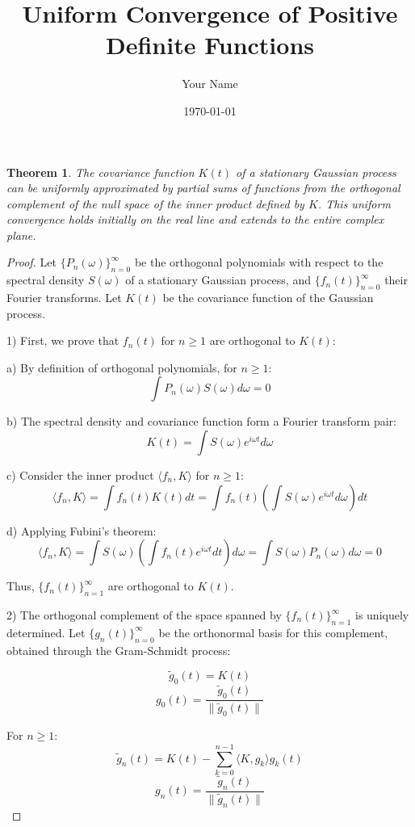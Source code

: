 \documentclass{article}
\title{Uniform Convergence of Positive Definite Functions}
\author{Your Name}
\date{\today}
\newtheorem{theorem}{Theorem}
\begin{document}
\maketitle

\begin{theorem}
The covariance function $K(t)$ of a stationary Gaussian process can be uniformly approximated by partial sums of functions from the orthogonal complement of the null space of the inner product defined by $K$. This uniform convergence holds initially on the real line and extends to the entire complex plane.
\end{theorem}

\begin{proof}
Let $\{P_n(\omega)\}_{n=0}^{\infty}$ be the orthogonal polynomials with respect to the spectral density $S(\omega)$ of a stationary Gaussian process, and $\{f_n(t)\}_{n=0}^{\infty}$ their Fourier transforms. Let $K(t)$ be the covariance function of the Gaussian process.

1) First, we prove that $f_n(t)$ for $n \geq 1$ are orthogonal to $K(t)$:

   a) By definition of orthogonal polynomials, for $n \geq 1$:
      $$\int P_n(\omega)S(\omega)d\omega = 0$$

   b) The spectral density and covariance function form a Fourier transform pair:
      $$K(t) = \int S(\omega)e^{i\omega t}d\omega$$

   c) Consider the inner product $\langle f_n, K \rangle$ for $n \geq 1$:
      $$\langle f_n, K \rangle = \int f_n(t)K(t)dt = \int f_n(t) \left(\int S(\omega)e^{i\omega t}d\omega\right) dt$$

   d) Applying Fubini's theorem:
      $$\langle f_n, K \rangle = \int S(\omega) \left(\int f_n(t)e^{i\omega t}dt\right) d\omega = \int S(\omega)P_n(\omega)d\omega = 0$$

   Thus, $\{f_n(t)\}_{n=1}^{\infty}$ are orthogonal to $K(t)$.

2) The orthogonal complement of the space spanned by $\{f_n(t)\}_{n=1}^{\infty}$ is uniquely determined. Let $\{g_n(t)\}_{n=0}^{\infty}$ be the orthonormal basis for this complement, obtained through the Gram-Schmidt process:

   $$\tilde{g}_0(t) = K(t)$$
   $$g_0(t) = \frac{\tilde{g}_0(t)}{\|\tilde{g}_0(t)\|}$$

   For $n \geq 1$:
   $$\tilde{g}_n(t) = K(t) - \sum_{k=0}^{n-1} \langle K, g_k \rangle g_k(t)$$
   $$g_n(t) = \frac{\tilde{g}_n(t)}{\|\tilde{g}_n(t)\|}$$


\end{proof}
\end{document}
